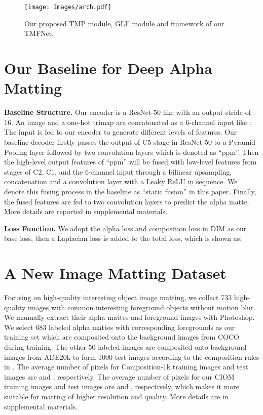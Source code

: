 \documentclass[10pt,twocolumn,letterpaper]{article}
\begin{document}
\begin{figure*}[t]
  \centering
  \texttt{[image: Images/arch.pdf]}
  \caption{Our proposed TMP module, GLF module and framework of our TMFNet.}
  \label{fig:fra}
\end{figure*}

\section{Our Baseline for Deep Alpha Matting}
\textbf{Baseline Structure.} Our encoder is a ResNet-50 \cite{resnet} like \cite{sim} with an output stride of 16. An image and a one-hot trimap are concatenated as a 6-channel input like \cite{gca}. The input is fed to our encoder to generate different levels of features. Our baseline decoder firstly passes the output of C5 stage in ResNet-50 to a Pyramid Pooling layer \cite{psp} followed by two  convolution layers  which is denoted as ``ppm''. Then the high-level output features of ``ppm'' will be fused with low-level features from stages of C2, C1, and the 6-channel input through a bilinear upsampling, concatenation and a convolution layer with a Leaky ReLU \cite{leaky} in sequence. We denote this fusing process in the baseline as ``static fusion'' in this paper. Finally, the fused features are fed to two convolution layers to predict the alpha matte. More details are reported in supplemental materials.

\textbf{Loss Function.} We adopt the alpha loss  and composition loss  in DIM \cite{deepmatting} as our base loss, then a Laplacian loss   \cite{context} is added to the total loss, which is shown as:




\section{A New Image Matting Dataset}
Focusing on high-quality interesting object image matting, we collect 733 high-quality images with common interesting foreground objects without motion blur. We manually  extract their alpha
mattes and foreground images with Photoshop. We select 683 labeled alpha mattes with corresponding foregrounds as our training set which are composited onto the background images from COCO \cite{coco} during training. The other 50 labeled images are composited onto background images from ADE20k \cite{ade} to form 1000 test images according to the composition rules in \cite{deepmatting}. The average number of pixels for Composition-1k  \cite{deepmatting} training images and test images are  and , respectively. The average number of pixels for our CIOM training images and test images are  and , respectively, which makes it more suitable for matting of higher resolution and quality. More details are in supplemental materials. 
\end{document}
